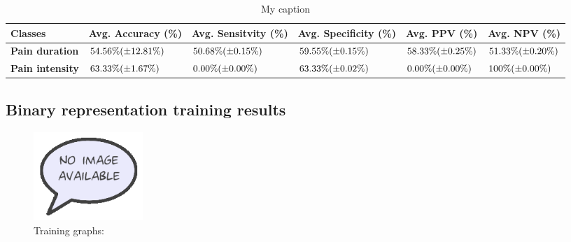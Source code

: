 \documentclass[12pt,a4paper]{article}
\begin{document}
\begin{table}[H]
\centering
\begin{tabular}{|p{2cm}|p{2.2cm}|p{2.2cm}|p{2.2cm}|p{2cm}|p{2cm}|}
\hline
\textbf{Classes}          & \textbf{Avg. Accuracy (\%)} & \textbf{Avg. Sensitvity (\%)} & \textbf{Avg. Specificity (\%)} & \textbf{Avg. PPV (\%)} & \textbf{Avg. NPV (\%)} \\ \hline
\textbf{Pain duration} & $54.56\%\newline(\pm12.81\%)$ & $50.68\%\newline(\pm0.15\%)$ & $59.55\%\newline(\pm0.15\%)$ & $58.33\%\newline(\pm0.25\%)$ & $51.33\%\newline(\pm0.20\%)$ \\ \hline
\textbf{Pain intensity}   & $63.33\%\newline(\pm1.67\%)$ & $0.00\%\newline(\pm0.00\%)$ & $63.33\%\newline(\pm0.02\%)$ & $0.00\%\newline(\pm0.00\%)$ & $100\%\newline(\pm0.00\%)$ \\ \hline
\end{tabular}
\label{my-label}
\caption{My caption}
\end{table}

\subsection{Binary representation training results}
\begin{figure} [H]
\centering
\includegraphics[width=0.2\textwidth]{figures/missimage}
\caption{Training graphs:}
\label{fig:binaryGraph}  
\end{figure}
\end{document}
